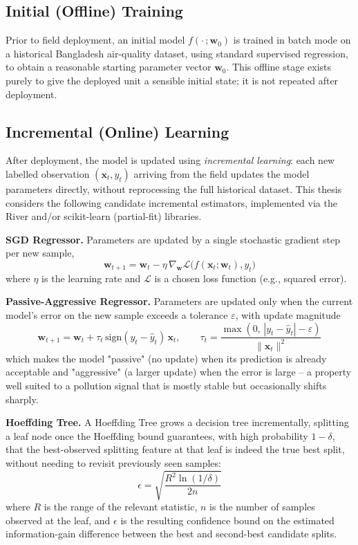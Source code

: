 \subsection{Initial (Offline) Training}
Prior to field deployment, an initial model $f(\cdot\,;\mathbf{w}_0)$ is trained in batch mode on a historical Bangladesh air-quality dataset, using standard supervised regression, to obtain a reasonable starting parameter vector $\mathbf{w}_0$. This offline stage exists purely to give the deployed unit a sensible initial state; it is not repeated after deployment.

\subsection{Incremental (Online) Learning}
After deployment, the model is updated using \emph{incremental learning}: each new labelled observation $(\mathbf{x}_t, y_t)$ arriving from the field updates the model parameters directly, without reprocessing the full historical dataset. This thesis considers the following candidate incremental estimators, implemented via the River and/or scikit-learn (partial-fit) libraries.

\textbf{SGD Regressor.} Parameters are updated by a single stochastic gradient step per new sample,
\begin{equation}
\mathbf{w}_{t+1} = \mathbf{w}_t - \eta \, \nabla_{\mathbf{w}} \mathcal{L}\big(f(\mathbf{x}_t;\mathbf{w}_t), y_t\big)
\label{eq:sgd}
\end{equation}
where $\eta$ is the learning rate and $\mathcal{L}$ is a chosen loss function (e.g., squared error).

\textbf{Passive-Aggressive Regressor.} Parameters are updated only when the current model's error on the new sample exceeds a tolerance $\varepsilon$, with update magnitude
\begin{equation}
\mathbf{w}_{t+1} = \mathbf{w}_t + \tau_t\, \text{sign}(y_t - \hat{y}_t)\, \mathbf{x}_t, \qquad
\tau_t = \frac{\max(0,\, |y_t - \hat{y}_t| - \varepsilon)}{\lVert \mathbf{x}_t \rVert^2}
\label{eq:pa}
\end{equation}
which makes the model "passive" (no update) when its prediction is already acceptable and "aggressive" (a larger update) when the error is large -- a property well suited to a pollution signal that is mostly stable but occasionally shifts sharply.

\textbf{Hoeffding Tree.} A Hoeffding Tree grows a decision tree incrementally, splitting a leaf node once the Hoeffding bound guarantees, with high probability $1-\delta$, that the best-observed splitting feature at that leaf is indeed the true best split, without needing to revisit previously seen samples:
\begin{equation}
\epsilon = \sqrt{\frac{R^2 \ln(1/\delta)}{2n}}
\label{eq:hoeffding}
\end{equation}
where $R$ is the range of the relevant statistic, $n$ is the number of samples observed at the leaf, and $\epsilon$ is the resulting confidence bound on the estimated information-gain difference between the best and second-best candidate splits.

